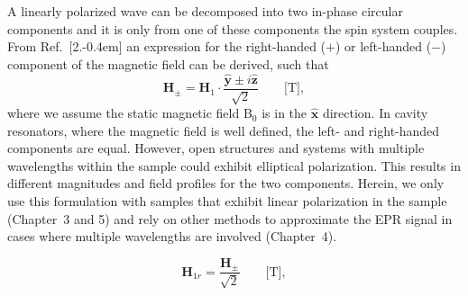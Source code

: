 A linearly polarized wave can be decomposed into two in-phase circular components and it is only from one of these components the spin system couples. \cite{abragam1961} From Ref.~[2.\kern-0.4em] an expression for the right-handed ($+$) or left-handed ($-$) component of the magnetic field can be derived, such that
\begin{equation}
    \mathbf{H}_{\pm} =  \mathbf{H}_{1}\cdot\frac{\mathbf{\hat{y}} \pm i\mathbf{\hat{z}}}{\sqrt{2}} \qquad \text{[T]}, \label{circpoleHpm}
\end{equation}
where we assume the static magnetic field B$_0$ is in the $\mathbf{\hat{x}}$ direction. In cavity resonators, where the magnetic field is well defined, the left- and right-handed components are equal. However, open structures and systems with multiple wavelengths within the sample could exhibit elliptical polarization. This results in different magnitudes and field profiles for the two components. Herein, we only use this formulation with samples that exhibit linear polarization in the sample (Chapter~3 and 5) and rely on other methods to approximate the EPR signal in cases where multiple wavelengths are involved (Chapter~4).

\begin{equation}
    \mathbf{H}_{1r} =  \frac{\mathbf{H}_{\pm}}{\sqrt{2}} \qquad \text{[T]}, \label{circpoleH}
\end{equation}


